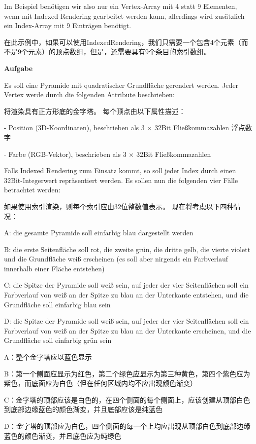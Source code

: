 \documentclass[fleqn]{article}
\begin{document}
Im Beispiel benötigen wir also nur ein Vertex-Array mit 4 statt 9 Elementen, 
wenn mit Indexed Rendering gearbeitet werden kann, 
allerdings wird zusätzlich ein Index-Array mit 9 Einträgen benötigt. 

在此示例中，如果可以使用IndexedRendering，我们只需要一个包含4个元素（而不是9个元素）的顶点数组，但是，还需要具有9个条目的索引数组。

\noindent\textbf{Aufgabe} 

Es soll eine Pyramide mit quadratischer Grundfläche gerendert werden. Jeder Vertex werde durch die folgenden Attribute beschrieben:

将渲染具有正方形底的金字塔。 每个顶点由以下属性描述：

- Position (3D-Koordinaten), beschrieben als 3 $\times$ 32Bit Fließkommazahlen 浮点数字

- Farbe (RGB-Vektor), beschrieben als 3 $\times$ 32Bit Fließkommazahlen

Falls Indexed Rendering zum Einsatz kommt, so soll jeder Index durch einen 32Bit-Integerwert repräsentiert werden. Es sollen nun die folgenden vier Fälle betrachtet werden:

如果使用索引渲染，则每个索引应由32位整数值表示。 现在将考虑以下四种情况：

A: die gesamte Pyramide soll einfarbig blau dargestellt werden

B: die erste Seitenfläche soll rot, die zweite grün, die dritte gelb, die vierte violett und die Grundfläche weiß erscheinen (es soll aber nirgends ein Farbverlauf innerhalb einer Fläche entstehen)

C: die Spitze der Pyramide soll weiß sein, auf jeder der vier Seitenflächen soll ein Farbverlauf von weiß an der Spitze zu blau an der Unterkante entstehen, und die Grundfläche soll einfarbig blau sein

D: die Spitze der Pyramide soll weiß sein, auf jeder der vier Seitenflächen soll ein Farbverlauf von weiß an der Spitze zu blau an der Unterkante erscheinen, und die Grundfläche soll einfarbig grün sein

A：整个金字塔应以蓝色显示

B：第一个侧面应显示为红色，第二个绿色应显示为第三种黄色，第四个紫色应为紫色，而底面应为白色（但在任何区域内均不应出现颜色渐变）

C：金字塔的顶部应该是白色的，在四个侧面的每个侧面上，应该创建从顶部白色到底部边缘蓝色的颜色渐变，并且底部应该是纯蓝色

D：金字塔的顶部应为白色，四个侧面的每一个上均应出现从顶部白色到底部边缘蓝色的颜色渐变，并且底色应为纯绿色
\end{document}
